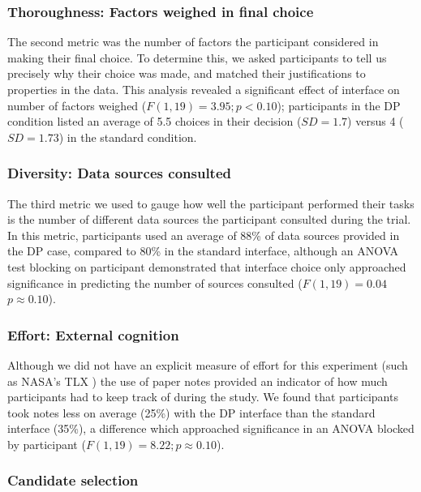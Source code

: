 \documentclass{sigchi}
\begin{document}
\subsubsection{Thoroughness: Factors weighed in final choice}
The second metric was the number of factors the participant considered in making their final choice. To determine this, we asked participants to tell us precisely why their choice was made, and matched their justifications to properties in the data.  This analysis revealed a significant effect of interface on number of factors weighed ($F(1,19)=3.95; p<0.10$); participants in the DP condition listed an average of 5.5 choices in their decision ($SD=1.7$) versus 4 ($SD=1.73$) in the standard condition.

\subsubsection{Diversity: Data sources consulted}
The third metric we used to gauge how well the participant performed their tasks is the number of different data sources the participant consulted during the trial. In this metric, participants used an average of 88\% of data sources provided in the DP case, compared to 80\% in the standard interface, although an ANOVA test blocking on participant demonstrated that interface choice only approached significance in predicting the number of sources consulted ($F(1,19)=0.04$ $p\approx0.10$).

\subsubsection{Effort: External cognition}
Although we did not have an explicit measure of effort for this experiment (such as NASA's TLX \cite{tlx}) the use of paper notes provided an indicator of how much participants had to keep track of during the study.  We found that participants took notes less on average (25\%) with the DP interface than the standard interface (35\%), a difference which approached significance in an ANOVA blocked by participant ($F(1,19)= 8.22; p\approx0.10$).

\subsubsection{Candidate selection}
\end{document}
